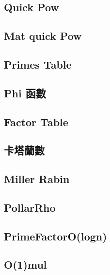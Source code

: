 \subsection{Quick Pow}


\subsection{Mat quick Pow}


\subsection{Primes Table}


\subsection{Phi 函數}


\subsection{Factor Table}


\subsection{卡塔蘭數}


\subsection{Miller Rabin}


\subsection{PollarRho}


\subsection{PrimeFactorO(logn)}


\subsection{O(1)mul}



